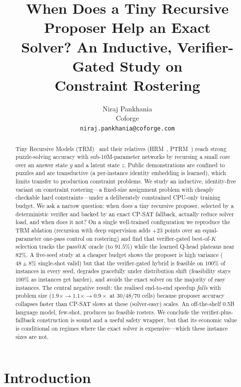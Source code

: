 \documentclass{article}
\title{When Does a Tiny Recursive Proposer Help an Exact\\
Solver? An Inductive, Verifier-Gated Study on\\
Constraint Rostering}
\author{%
  Niraj Pankhania \\
  Coforge \\
  \texttt{niraj.pankhania@coforge.com} \\
}
\begin{document}
\maketitle

\begin{abstract}
Tiny Recursive Models (TRM)~\cite{trm} and their relatives (HRM~\cite{hrm},
PTRM~\cite{ptrm}) reach strong puzzle-solving accuracy with sub-10M-parameter
networks by recursing a small core over an answer state $y$ and a latent state
$z$. Public demonstrations are confined to puzzles and are transductive (a
per-instance identity embedding is learned), which limits transfer to production
constraint problems. We study an inductive, identity-free variant on constraint
rostering---a fixed-size assignment problem with cheaply checkable hard
constraints---under a deliberately constrained CPU-only training budget. We ask a
narrow question: when does a tiny recursive proposer, selected by a deterministic
verifier and backed by an exact CP-SAT fallback, actually reduce solver load, and
when does it not? On a single well-trained configuration we reproduce the TRM
ablation (recursion with deep supervision adds $+23$ points over an equal-parameter
one-pass control on rostering) and find that verifier-gated best-of-$K$ selection
tracks the pass@$K$ oracle (to $91.5\%$) while the learned Q-head plateaus near
$82\%$. A five-seed study at a cheaper budget shows the proposer is high variance
($48\pm8\%$ single-shot valid) but that the verifier-gated hybrid is feasible on
$100\%$ of instances in every seed, degrades gracefully under distribution shift
(feasibility stays $100\%$ as instances get harder), and avoids the exact solver
on the majority of easy instances. The central negative result: the realised
end-to-end speedup \emph{falls} with problem size ($1.9\times \to 1.1\times \to
0.9\times$ at $30/48/70$ cells) because proposer accuracy collapses faster than
CP-SAT slows at these (solver-easy) scales. An off-the-shelf 0.5B language model,
few-shot, produces no feasible rosters. We conclude the verifier-plus-fallback
construction is sound and a useful safety wrapper, but that its economic value is
conditional on regimes where the exact solver is expensive---which these instance
sizes are not.
\end{abstract}

\section{Introduction}
\end{document}
